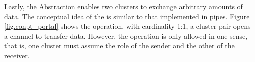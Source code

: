 			Lastly, the \portal Abstraction enables two clusters to exchange arbitrary
			amounts of data.
			The conceptual idea of ​​the \portal is similar to that implemented in \posix pipes.
			Figure \ref{fig.conpt_portal} shows the \portal operation, with cardinality
			1:1, a cluster pair opens a channel to transfer data.
			However, the operation is only allowed in one sense, that is, one
			cluster must assume the role of the sender and the other of the receiver.
